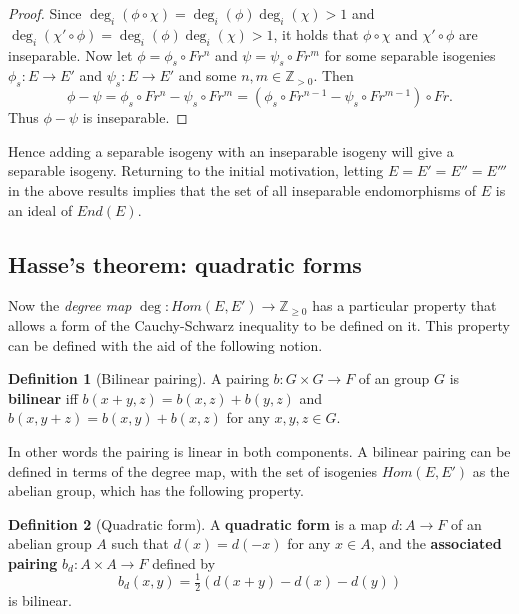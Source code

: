 \documentclass{article}
\newcommand{\Z}{\mathbb{Z}}
\newcommand{\rb}[1]{\left( #1 \right)}
\theoremstyle{definition}
\newtheorem*{definition}{Definition}
\begin{document}
\begin{proof}
Since $ \deg_i\rb{\phi \circ \chi} = \deg_i\rb{\phi}\deg_i\rb{\chi} > 1 $ and $ \deg_i\rb{\chi' \circ \phi} = \deg_i\rb{\phi}\deg_i\rb{\chi} > 1 $, it holds that $ \phi \circ \chi $ and $ \chi' \circ \phi $ are inseparable. Now let $ \phi = \phi_s \circ Fr^n $ and $ \psi = \psi_s \circ Fr^m $ for some separable isogenies $ \phi_s : E \to E' $ and $ \psi_s : E \to E' $ and some $ n, m \in \Z_{> 0} $. Then
$$ \phi - \psi = \phi_s \circ Fr^n - \psi_s \circ Fr^m = \rb{\phi_s \circ Fr^{n - 1} - \psi_s \circ Fr^{m - 1}} \circ Fr. $$
Thus $ \phi - \psi $ is inseparable.
\end{proof}

Hence adding a separable isogeny with an inseparable isogeny will give a separable isogeny. Returning to the initial motivation, letting $ E = E' = E'' = E''' $ in the above results implies that the set of all inseparable endomorphisms of $ E $ is an ideal of $ End\rb{E} $.

\pagebreak

\subsection{Hasse's theorem: quadratic forms}

Now the \emph{degree map} $ \deg : Hom\rb{E, E'} \to \Z_{\ge 0} $ has a particular property that allows a form of the Cauchy-Schwarz inequality to be defined on it. This property can be defined with the aid of the following notion.

\begin{definition}[Bilinear pairing]
A pairing $ b : G \times G \to F $ of an group $ G $ is \textbf{bilinear} iff $ b\rb{x + y, z} = b\rb{x, z} + b\rb{y, z} $ and $ b\rb{x, y + z} = b\rb{x, y} + b\rb{x, z} $ for any $ x, y, z \in G $.
\end{definition}

In other words the pairing is linear in both components. A bilinear pairing can be defined in terms of the degree map, with the set of isogenies $ Hom\rb{E, E'} $ as the abelian group, which has the following property.

\begin{definition}[Quadratic form]
A \textbf{quadratic form} is a map $ d : A \to F $ of an abelian group $ A $ such that $ d\rb{x} = d\rb{-x} $ for any $ x \in A $, and the \textbf{associated pairing} $ b_d : A \times A \to F $ defined by
$$ b_d\rb{x, y} = \tfrac{1}{2}\rb{d\rb{x + y} - d\rb{x} - d\rb{y}} $$
is bilinear.
\end{definition}
\end{document}
